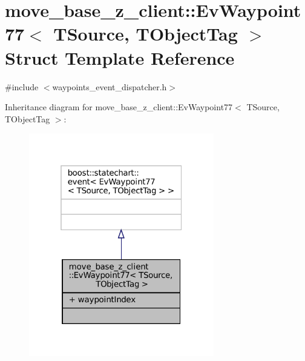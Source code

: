 \hypertarget{structmove__base__z__client_1_1EvWaypoint77}{}\section{move\+\_\+base\+\_\+z\+\_\+client\+:\+:Ev\+Waypoint77$<$ T\+Source, T\+Object\+Tag $>$ Struct Template Reference}
\label{structmove__base__z__client_1_1EvWaypoint77}


{\ttfamily \#include $<$waypoints\+\_\+event\+\_\+dispatcher.\+h$>$}



Inheritance diagram for move\+\_\+base\+\_\+z\+\_\+client\+:\+:Ev\+Waypoint77$<$ T\+Source, T\+Object\+Tag $>$\+:
\nopagebreak
\begin{figure}[H]
\begin{center}
\leavevmode
\includegraphics[width=229pt]{structmove__base__z__client_1_1EvWaypoint77__inherit__graph}
\end{center}
\end{figure}


